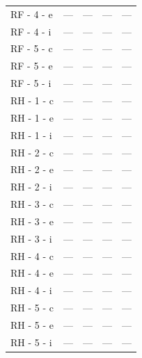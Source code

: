 \documentclass[a4paper,11pt]{article}
\begin{document}
\begin{small}
\begin{longtable}{p{4.5cm}rrrr}
RF - 4 - e & --- & --- & --- & --- \\
RF - 4 - i & --- & --- & --- & --- \\
RF - 5 - c & --- & --- & --- & --- \\
RF - 5 - e & --- & --- & --- & --- \\
RF - 5 - i & --- & --- & --- & --- \\
RH - 1 - c & --- & --- & --- & --- \\
RH - 1 - e & --- & --- & --- & --- \\
RH - 1 - i & --- & --- & --- & --- \\
RH - 2 - c & --- & --- & --- & --- \\
RH - 2 - e & --- & --- & --- & --- \\
RH - 2 - i & --- & --- & --- & --- \\
RH - 3 - c & --- & --- & --- & --- \\
RH - 3 - e & --- & --- & --- & --- \\
RH - 3 - i & --- & --- & --- & --- \\
RH - 4 - c & --- & --- & --- & --- \\
RH - 4 - e & --- & --- & --- & --- \\
RH - 4 - i & --- & --- & --- & --- \\
RH - 5 - c & --- & --- & --- & --- \\
RH - 5 - e & --- & --- & --- & --- \\
RH - 5 - i & --- & --- & --- & --- \\
\end{longtable}
\end{small}
\end{document}
